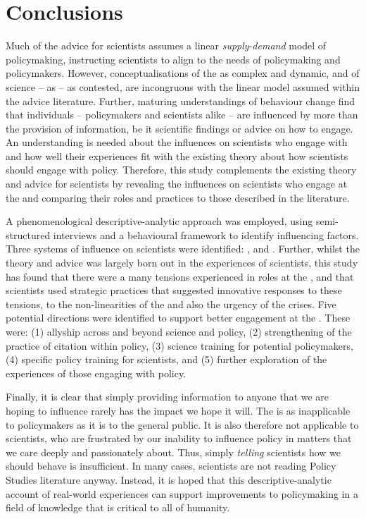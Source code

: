 \chapter{Conclusions}\label{ch:conclusions}

Much of the advice for scientists assumes a linear \emph{supply}-\emph{demand} model of policymaking, instructing scientists to align to the needs of policymaking and policymakers. However, conceptualisations of the \SPI{} as complex and dynamic, and of \CAN{} science -- as \PNS{} -- as contested, are incongruous with the linear model assumed within the advice literature. Further, maturing understandings of behaviour change find that individuals -- policymakers and scientists alike -- are influenced by more than the provision of information, be it scientific findings or advice on how to engage. An understanding is needed about the influences on scientists who engage with \CAN{} \SPI{} and how well their experiences fit with the existing theory about how scientists should engage with policy. Therefore, this study complements the existing theory and advice for scientists by revealing the influences on scientists who engage at the \CAN{} \SPI{} and comparing their roles and practices to those described in the literature.

A phenomenological descriptive-analytic approach was employed, using semi-structured interviews and a behavioural framework to identify influencing factors. Three systems of influence on scientists were identified: \skiinte, \skiknow{} and \skiscip. Further, whilst the theory and advice was largely born out in the experiences of scientists, this study has found that there were a many tensions experienced in roles at the \SPI, and that scientists used strategic practices that suggested innovative responses to these tensions, to the non-linearities of the \SPI{} and also the urgency of the \CAN{} crises. Five potential directions were identified to support better engagement at the \CAN{} \SPI. These were: (1) allyship across and beyond \CAN{} science and policy, (2) strengthening of the practice of citation within policy, (3) science training for potential policymakers, (4) specific policy training for scientists, and (5) further exploration of the experiences of those engaging with policy. 

Finally, it is clear that simply providing information to anyone that we are hoping to influence rarely has the impact we hope it will. The \IDM{} is as inapplicable to policymakers as it is to the general public. It is also therefore not applicable to scientists, who are frustrated by our inability to influence policy in matters that we care deeply and passionately about. Thus, simply \emph{telling} scientists how we should behave is insufficient. In many cases, scientists are not reading Policy Studies literature anyway. Instead, it is hoped that this descriptive-analytic account of real-world experiences can support improvements to policymaking in a field of knowledge that is critical to all of humanity. 